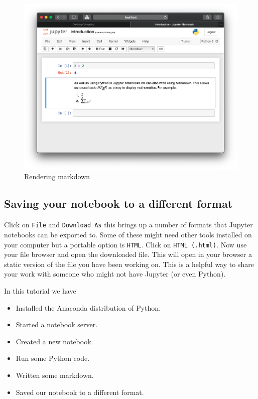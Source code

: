 \begin{figure}[htbp]
\centering
    \includegraphics[width=0.750\linewidth]{assets/rendering_markdown/main.png}
    \caption{Rendering markdown}\label{fig:rendering_markdown}
\end{figure}

\subsection{Saving your notebook to a different format}

Click on \texttt{File} and \texttt{Download As} this brings up a number of formats that
Jupyter notebooks can be exported to. Some of these might need other tools
installed on your computer but a portable option is \texttt{HTML}.
Click on \texttt{HTML (.html)}.
Now use your file browser and open the downloaded file. This will open in your
browser a static version of the file you have been working on. This is a helpful
way to share your work with someone who might not have Jupyter (or even Python).

In this tutorial we have
\begin{itemize}
\item 

Installed the Anaconda distribution of Python.

\item 

Started a notebook server.

\item 

Created a new notebook.

\item 

Run some Python code.

\item 

Written some markdown.

\item 

Saved our notebook to a different format.

\end{itemize}




